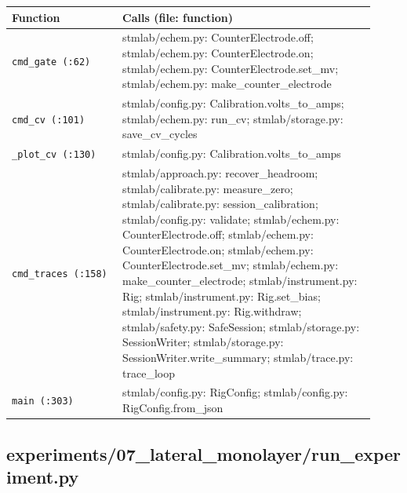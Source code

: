 \small\setlength{\LTleft}{0pt}\setlength{\LTright}{\fill}
\begin{longtable}{@{}>{\raggedright\arraybackslash}p{0.280\linewidth}>{\raggedright\arraybackslash}p{0.640\linewidth}@{}}
\toprule
\textbf{Function} & \textbf{Calls (file: function)} \\
\midrule\endhead
\texttt{cmd\_\discretionary{}{}{}gate (:62)} & stmlab/echem.py: CounterElectrode.off; stmlab/echem.py: CounterElectrode.on; stmlab/echem.py: CounterElectrode.set\_mv; stmlab/echem.py: make\_counter\_electrode \\
\texttt{cmd\_\discretionary{}{}{}cv (:101)} & stmlab/config.py: Calibration.volts\_to\_amps; stmlab/echem.py: run\_cv; stmlab/storage.py: save\_cv\_cycles \\
\texttt{\_\discretionary{}{}{}plot\_\discretionary{}{}{}cv (:130)} & stmlab/config.py: Calibration.volts\_to\_amps \\
\texttt{cmd\_\discretionary{}{}{}traces (:158)} & stmlab/approach.py: recover\_headroom; stmlab/calibrate.py: measure\_zero; stmlab/calibrate.py: session\_calibration; stmlab/config.py: validate; stmlab/echem.py: CounterElectrode.off; stmlab/echem.py: CounterElectrode.on; stmlab/echem.py: CounterElectrode.set\_mv; stmlab/echem.py: make\_counter\_electrode; stmlab/instrument.py: Rig; stmlab/instrument.py: Rig.set\_bias; stmlab/instrument.py: Rig.withdraw; stmlab/safety.py: SafeSession; stmlab/storage.py: SessionWriter; stmlab/storage.py: SessionWriter.write\_summary; stmlab/trace.py: trace\_loop \\
\texttt{main (:303)} & stmlab/config.py: RigConfig; stmlab/config.py: RigConfig.from\_json \\
\bottomrule
\end{longtable}
\normalsize

\subsection{experiments/07\_lateral\_monolayer/run\_experiment.py}


